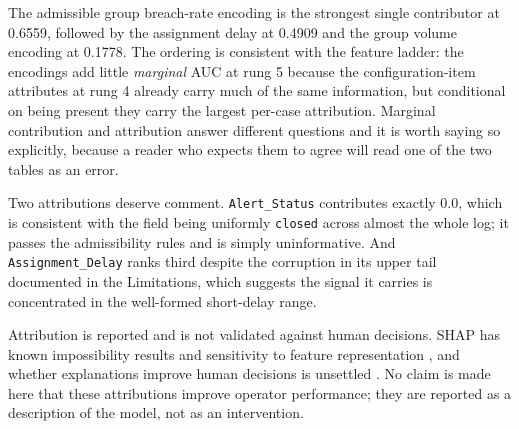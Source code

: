 The admissible group breach-rate encoding is the strongest single contributor at \num{0.6559},
followed by the assignment delay at \num{0.4909} and the group volume encoding at \num{0.1778}. The
ordering is consistent with the feature ladder: the encodings add little \emph{marginal} AUC at
rung 5 because the configuration-item attributes at rung 4 already carry much of the same
information, but conditional on being present they carry the largest per-case attribution.
Marginal contribution and attribution answer different questions and it is worth saying so
explicitly, because a reader who expects them to agree will read one of the two tables as an
error.

Two attributions deserve comment. \texttt{Alert\_Status} contributes exactly \num{0.0}, which
is consistent with the field being uniformly \texttt{closed} across almost the whole log; it
passes the admissibility rules and is simply uninformative. And \texttt{Assignment\_Delay} ranks
third despite the corruption in its upper tail documented in the Limitations, which suggests the
signal it carries is concentrated in the well-formed short-delay range.

Attribution is reported and is not validated against human decisions. SHAP has known
impossibility results \citep{bilodeau2024impossibility} and sensitivity to feature
representation \citep{hwang2025shapbased}, and whether explanations improve human decisions is
unsettled \citep{haag2026explanations,chae2025explanation}. No claim is made here that these
attributions improve operator performance; they are reported as a description of the model, not
as an intervention.

